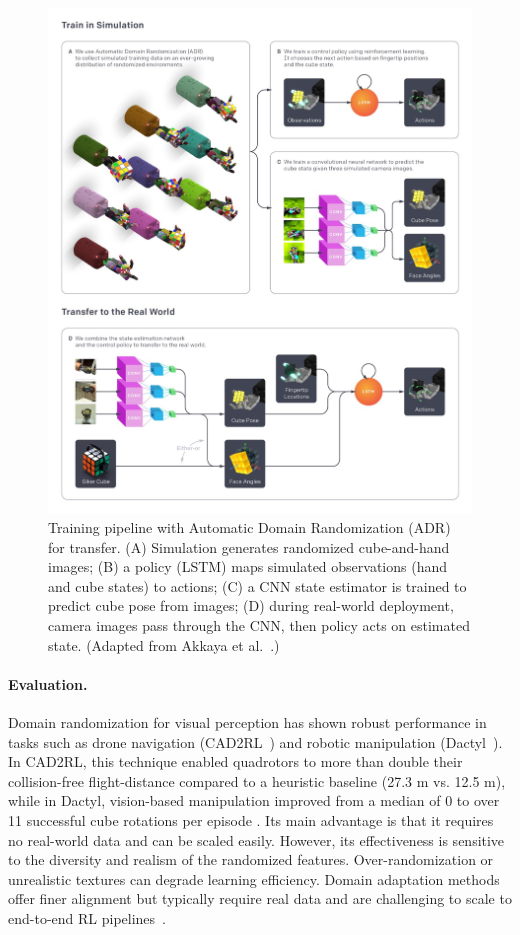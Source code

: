 \begin{figure}[H]
    \centering
    \includegraphics[width=0.95\linewidth]{figures/figAdrPipeline.png}
    \caption{Training pipeline with Automatic Domain Randomization (ADR) for \simtoreal transfer. (A) Simulation generates randomized cube-and-hand images; (B) a policy (LSTM) maps simulated observations (hand and cube states) to actions; (C) a CNN state estimator is trained to predict cube pose from images; (D) during real-world deployment, camera images pass through the CNN, then policy acts on estimated state. (Adapted from Akkaya et al.~\cite{Akkaya2019}.)}
    \label{fig:adr_pipeline}
\end{figure}

\paragraph{Evaluation.} Domain randomization for visual perception has shown robust performance in tasks such as drone navigation (CAD2RL~\cite{Sadeghi2017}) and robotic manipulation (Dactyl~\cite{Akkaya2019}). In CAD2RL, this technique enabled quadrotors to more than double their collision-free flight-distance compared to a heuristic baseline (27.3 m vs. 12.5 m), while in Dactyl, vision-based manipulation improved from a median of 0 to over 11 successful cube rotations per episode \cite{Akkaya2019,Sadeghi2017}. Its main advantage is that it requires no real-world data and can be scaled easily. However, its effectiveness is sensitive to the diversity and realism of the randomized features. Over-randomization or unrealistic textures can degrade learning efficiency. Domain adaptation methods offer finer alignment but typically require real data and are challenging to scale to end-to-end RL pipelines~\cite{Tzeng2017}.
